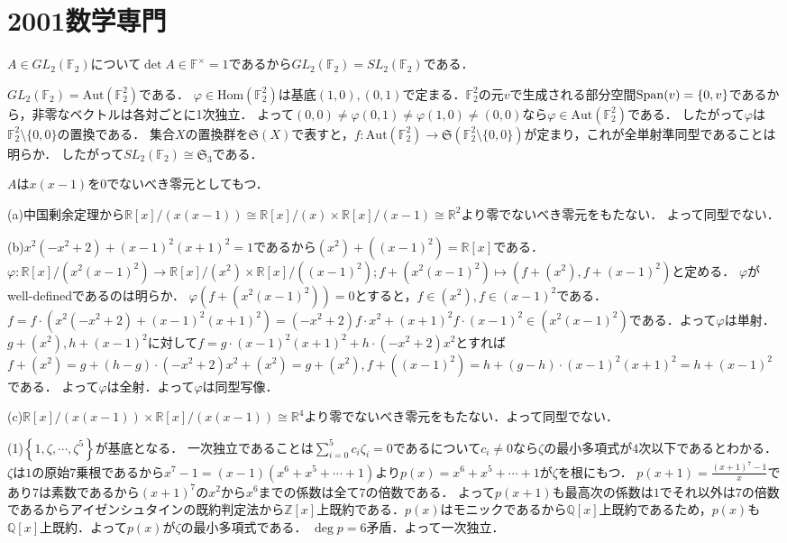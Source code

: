 \documentclass[
		book,
		head_space=20mm,
		foot_space=20mm,
		gutter=10mm,
		line_length=190mm
]{jlreq}
\begin{document}
\section{2001数学専門}
$A\in GL_2(\mathbb{F}_2)$について$\det A\in \mathbb{F}^\times={1}$であるから$GL_2(\mathbb{F}_2)=SL_2(\mathbb{F}_2)$である．

$GL_2(\mathbb{F}_2)=\mathrm{Aut}(\mathbb{F}_2^2)$である．
$\varphi\in \mathrm{Hom}(\mathbb{F}_2^2)$は基底$(1,0),(0,1)$で定まる．$\mathbb{F}_2^2$の元$v$で生成される部分空間$\mathop{\mathrm{Span}}(v)=\left\{0, v \right\}$であるから，非零なベクトルは各対ごとに1次独立．
よって$(0,0)\neq \varphi(0,1)\neq \varphi(1,0)\neq (0,0)$なら$\varphi\in \mathrm{Aut}(\mathbb{F}_2^2)$である．
したがって$\varphi$は$\mathbb{F}_2^2\setminus\{0,0\}$の置換である．
集合$X$の置換群を$\mathfrak{S}(X)$で表すと，$f\colon \mathrm{Aut}(\mathbb{F}_2^2)\rightarrow \mathfrak{S}(\mathbb{F}_2^2\setminus\{0,0\})$が定まり，これが全単射準同型であることは明らか．
したがって$SL_2(\mathbb{F}_2)\cong \mathfrak{S}_3$である．

$A$は$x(x-1)$を$0$でないべき零元としてもつ．

(a)中国剰余定理から$\mathbb{R}[x]/(x(x-1))\cong \mathbb{R}[x]/(x)\times \mathbb{R}[x]/(x-1)\cong \mathbb{R}^2$より零でないべき零元をもたない．
よって同型でない．


(b)$x^2(-x^2+2)+(x-1)^2(x+1)^2=1$であるから$(x^2)+((x-1)^2)=\mathbb{R}[x]$である．
$\varphi\colon \mathbb{R}[x]/(x^2(x-1)^2)\rightarrow \mathbb{R}[x]/(x^2)\times \mathbb{R}[x]/((x-1)^2);f+(x^2(x-1)^2)\mapsto (f+(x^2),f+(x-1)^2)$と定める．
$\varphi$がwell-definedであるのは明らか．
$\varphi(f+(x^2(x-1)^2))=0$とすると，$f\in (x^2),f\in (x-1)^2$である．
$f=f\cdot(x^2(-x^2+2)+(x-1)^2(x+1)^2)=(-x^2+2)f\cdot x^2+(x+1)^2f\cdot (x-1)^2\in (x^2(x-1)^2)$である．よって$\varphi$は単射．
$g+(x^2),h+(x-1)^2$に対して$f=g\cdot(x-1)^2(x+1)^2+h\cdot(-x^2+2)x^2$とすれば
$f+(x^2)=g+(h-g)\cdot(-x^2+2)x^2+(x^2)=g+(x^2),f+((x-1)^2)=h+(g-h)\cdot(x-1)^2(x+1)^2=h+(x-1)^2$である．
よって$\varphi$は全射．よって$\varphi$は同型写像．

(c)$\mathbb{R}[x]/(x(x-1))\times \mathbb{R}[x]/(x(x-1))\cong \mathbb{R}^4$より零でないべき零元をもたない．よって同型でない．

(1)$\left\{ 1,\zeta,\cdots,\zeta^{5} \right\}$が基底となる．
一次独立であることは$\sum\limits_{i=0}^5 c_i \zeta_i=0$であるについて$c_i\neq 0$なら$\zeta$の最小多項式が$4$次以下であるとわかる．
$\zeta$は$1$の原始$7$乗根であるから$x^7-1=(x-1)(x^6+x^5+\cdots+1)$より$p(x)=x^6+x^5+\cdots+1$が$\zeta$を根にもつ．
$p(x+1)=\frac{(x+1)^7-1}{x}$であり$7$は素数であるから$(x+1)^7$の$x^2$から$x^6$までの係数は全て$7$の倍数である．
よって$p(x+1)$も最高次の係数は$1$でそれ以外は$7$の倍数であるからアイゼンシュタインの既約判定法から$\mathbb{Z}[x]$上既約である．$p(x)$はモニックであるから$\mathbb{Q}[x]$上既約であるため，$p(x)$も$\mathbb{Q}[x]$上既約．よって$p(x)$が$\zeta$の最小多項式である．
$\deg p=6$矛盾．よって一次独立．
\end{document}
